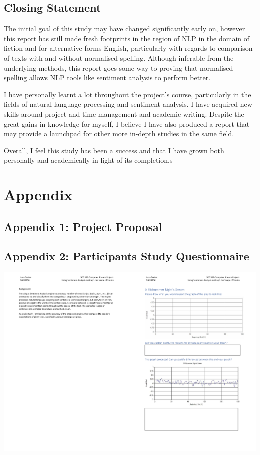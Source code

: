 \documentclass{article}
\begin{document}
    \subsection{Closing Statement}
        The initial goal of this study may have changed significantly early on, however this report has still made fresh footprints in the region of NLP in the domain of fiction and for alternative forms English, particularly with regards to comparison of texts with and without normalised spelling. Although inferable from the underlying methods, this report goes some way to proving that normalised spelling allows NLP tools like sentiment analysis to perform better.

        I have personally learnt a lot throughout the project's course, particularly in the fields of natural language processing and sentiment analysis. I have acquired new skills around project and time management and academic writing. Despite the great gains in knowledge for myself, I believe I have also produced a report that may provide a launchpad for other more in-depth studies in the same field.
        
        Overall, I feel this study has been a success and that I have grown both personally and academically in light of its completion.s
\label{sec:conclusion}
\newpage

\newpage
\section*{Appendix}
    \subsection*{Appendix 1: Project Proposal}
        
    \subsection*{Appendix 2: Participants Study Questionnaire}
        \includegraphics[width=1.5\textwidth, angle=90, origin=c]{Figures/Survey/Questionnaire}
\end{document}
